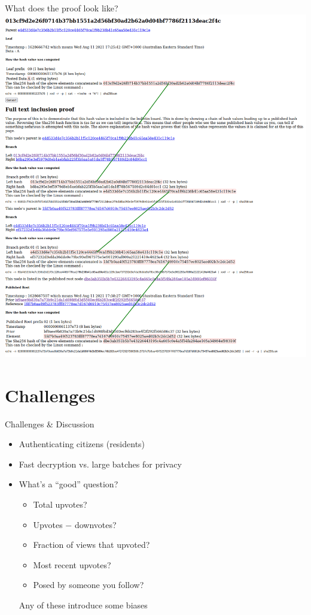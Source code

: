 \documentclass[10pt,xcolor=svgnames,169]{beamer} %
\begin{document}
	
	\begin{frame}[fragile]{What does the proof look like?}
		\includegraphics[scale=0.17]{InclusionProof.png}
	\end{frame}
	
	
	\section{Challenges}
	
	\begin{frame}{Challenges \& Discussion}
		\begin{itemize}
			\item Authenticating citizens (residents)
			\item Fast decryption vs. large batches for privacy
			\item What's a ``good'' question?
				\begin{itemize}
					\item Total upvotes?
					\item Upvotes $-$ downvotes?
					\item Fraction of views that upvoted?
					\item Most recent upvotes?
					\item Posed by someone you follow?
				\end{itemize}
			
			Any of these introduce some biases
		\end{itemize}
	\end{frame}
\end{document}
